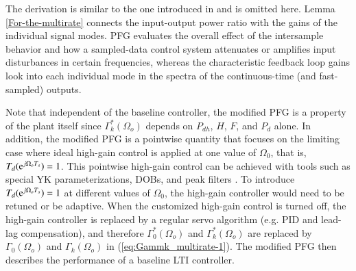 \documentclass [11pt, proquest] {uwthesis}[2020/02/24]
\begin{document}
The derivation is similar to the one introduced in \cite{oomen2007design}
and is omitted here. Lemma \ref{For-the-multirate} connects the input-output
power ratio with the gains of the individual signal modes. PFG evaluates
the overall effect of the intersample behavior and how a sampled-data
control system attenuates or amplifies input disturbances in certain
frequencies, whereas the characteristic feedback loop gains look into
each individual mode in the spectra of the continuous-time (and fast-sampled)
outputs. 

Note that independent of the baseline controller, the modified PFG
is a property of the plant itself since $\Gamma_{k}^{*}(\Omega_{o})$
depends on $P_{dh}$, $H$, $F$, and $P_{d}$ alone. In addition,
the modified PFG is a pointwise quantity that focuses on the limiting
case where ideal high-gain control is applied at one value of $\Omega_{0}$,
that is, $T_{d}(\mathrm{e}^{j\Omega_{o}T_{s}})=1$. This pointwise high-gain
control can be achieved with tools such as special YK parameterizations,
DOBs, and peak filters \cite{XuChen_TCST2012,Landau_EJC2013_Benchmark_Summary,sievers1992comparison}.
To introduce $T_{d}(\mathrm{e}^{j\Omega_{o}T_{s}})=1$ at different values
of $\Omega_{0}$, the high-gain controller would need to be retuned
or be adaptive. When the customized high-gain control is turned off,
the high-gain controller is replaced by a regular servo algorithm
(e.g. PID and lead-lag compensation), and therefore $\Gamma_{0}^{*}(\Omega_{o})$
and $\Gamma_{k}^{*}(\Omega_{o})$ are replaced by $\Gamma_{0}(\Omega_{o})$
and $\Gamma_{k}(\Omega_{o})$ in (\ref{eq:Gammk_multirate-1}). The
modified PFG then describes the performance of a baseline LTI controller.
\end{document}
